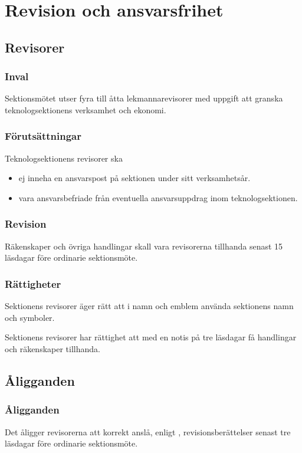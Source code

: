 \section{Revision och ansvarsfrihet}

\subsection{Revisorer}

\subsubsection{Inval}
Sektionsmötet utser fyra till åtta lekmannarevisorer med uppgift att granska teknologsektionens verksamhet och ekonomi.

\subsubsection{Förutsättningar}
Teknologsektionens revisorer ska 
\begin{itemize}
    \item ej inneha en ansvarspost på sektionen under sitt verksamhetsår.
    \item vara ansvarsbefriade från eventuella ansvarsuppdrag inom teknologsektionen. 
\end{itemize} 

\subsubsection{Revision}
Räkenskaper och övriga handlingar skall vara revisorerna tillhanda senast 15 läsdagar före ordinarie sektionsmöte. 

\subsubsection{Rättigheter}
Sektionens revisorer äger rätt att i namn och emblem använda sektionens namn och symboler.

Sektionens revisorer har rättighet att med en notis på tre läsdagar få handlingar och räkenskaper tillhanda.

\subsection{Åligganden}

\subsubsection{Åligganden}
Det åligger revisorerna att korrekt anslå, enligt , revisionsberättelser senast tre läsdagar före ordinarie sektionsmöte.

